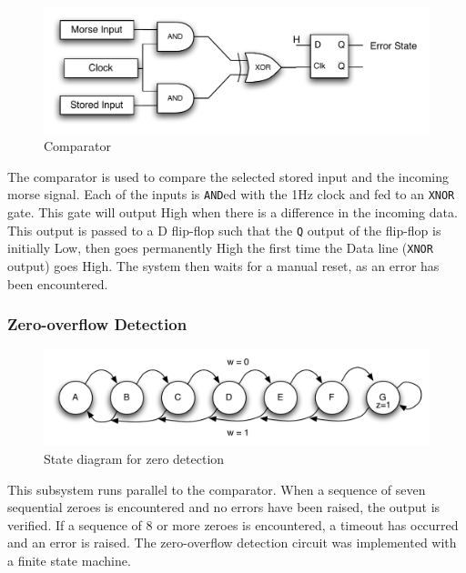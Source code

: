 \documentclass[11pt,letterpaper,titlepage]{article}
\begin{document}
\begin{figure}[!htb]
	\begin{center}
		\includegraphics[width=5in]{graphics/comparator.pdf}
		\caption{Comparator}
		\label{fig:Comparator}
	\end{center}
\end{figure}


The comparator is used to compare the selected stored input and the incoming morse signal. Each of the inputs is \texttt{AND}ed with the 1Hz clock and fed to an \texttt{XNOR} gate. This gate will output High when there is a difference in the incoming data. This output is passed to a D flip-flop such that the \texttt{Q} output of the flip-flop is initially Low, then goes permanently High the first time the Data line (\texttt{XNOR} output) goes High. The system then waits for a manual reset, as an error has been encountered.

\subsubsection{Zero-overflow Detection}\label{ssS:ZOD}

\begin{figure}
	\begin{center}
		\includegraphics[width=4.5in]{graphics/fsm.pdf}
		\caption{State diagram for zero detection}
		\label{fig:FSM}
	\end{center}
\end{figure}

This subsystem runs parallel to the comparator. When a sequence of seven sequential zeroes is encountered and no errors have been raised, the output is verified. If a sequence of 8 or more zeroes is encountered, a timeout has occurred and an error is raised. The zero-overflow detection circuit was implemented with a finite state machine.
\end{document}
